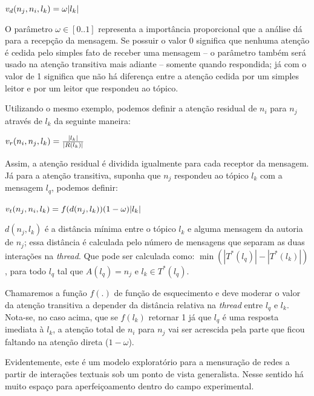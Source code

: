 \begin{Def}
\label{def:atedireta}
$v_d(n_j, n_i, l_k) = \omega|l_k|$
\end{Def}

O parâmetro $\omega \in [0..1]$ representa a importância proporcional que a
análise dá para a recepção da mensagem. Se possuir o valor 0 significa que
nenhuma atenção é cedida pelo simples fato de receber uma mensagem -- o parâmetro
também será usado na atenção transitiva mais adiante -- somente quando
respondida; já com o valor de 1 significa que não há diferença entre a atenção
cedida por um simples leitor e por um leitor que respondeu ao tópico.

Utilizando o mesmo exemplo, podemos definir a atenção residual de $n_i$ para
$n_j$ através de $l_k$ da seguinte maneira:

\begin{Def}
\label{def:ateresidual}
$v_r(n_i, n_j, l_k) = \frac{|l_k|}{|R(l_k)|}$
\end{Def}

Assim, a atenção residual é dividida igualmente para cada receptor da mensagem.
Já para a atenção transitiva, suponha que $n_j$ respondeu ao tópico $l_k$ com
a mensagem $l_q$, podemos definir:

\begin{Def}
\label{def:atetransitiva}
$v_t(n_j, n_i, l_k) = f(d(n_j, l_k))(1-\omega)|l_k|$  
\end{Def}

\begin{Def}
$d(n_j, l_k)$ é a distância mínima entre o tópico $l_k$ e alguma mensagem da
autoria de $n_j$; essa distância é calculada pelo número de mensagens que
separam as duas interações na \emph{thread}. Que pode ser calculada
como: $\min(|T^*(l_q)| - |T^*(l_k)|)$, para todo $l_q$ tal que $A(l_q) = n_j$ e
$l_k \in T^*(l_q)$.
\end{Def}

Chamaremos a função $f(.)$ de função de esquecimento e deve moderar o valor da
atenção transitiva a depender da distância relativa na \emph{thread} entre $l_q$
e $l_k$. Nota-se, no caso acima, que se $f(l_k)$ retornar 1 já que $l_q$ é uma
resposta imediata à $l_k$, a atenção total de $n_i$ para $n_j$ vai ser acrescida
pela parte que ficou faltando na atenção direta ($1-\omega$).

Evidentemente, este é um modelo exploratório para a mensuração de redes a partir
de interações textuais sob um ponto de vista generalista. Nesse sentido há muito
espaço para aperfeiçoamento dentro do campo experimental.


